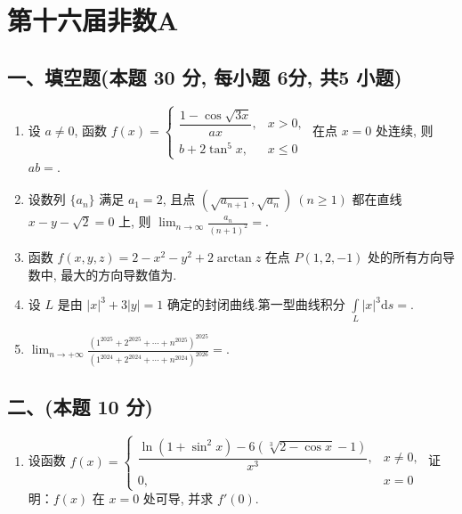 \newpage
\section{第十六届非数A}

\subsection*{一、填空题(本题 30 分,  每小题 6分,  共5 小题)}
\begin{enumerate}
    \item 设 $a \neq 0$, 函数
          $f(x) = \begin{cases}
                  \dfrac{1 - \cos \sqrt{3x}}{a x}, & x > 0,   \\[8pt]
                  b + 2 \tan^5 x,                  & x \leq 0
              \end{cases}$
          在点 $x = 0$ 处连续, 则 $ab =$\underline{\quad \quad}.
    \item 设数列 $\{a_n\}$ 满足 $a_1 = 2$, 且点 $(\sqrt{a_{n+1}}, \sqrt{a_n}) \ (n \geqslant 1)$ 都在直线 $x - y - \sqrt{2} = 0$ 上, 则 $\displaystyle\lim_{n \to \infty} \frac{a_n}{(n + 1)^2} =$\underline{\quad \quad}.
    \item 函数 $f(x, y, z) = 2 - x^2 - y^2 + 2 \arctan z$ 在点 $P(1, 2, -1)$ 处的所有方向导数中, 最大的方向导数值为\underline{\quad \quad}.
    \item 设 $L$ 是由 $|x|^3 + 3|y| = 1$ 确定的封闭曲线.第一型曲线积分 $\displaystyle\int\limits_L |x|^3 \mathrm{d}s =$\underline{\quad \quad}.
    \item $\displaystyle\lim_{n \to + \infty} \frac{(1^{2025} + 2^{2025} + \cdots + n^{2025})^{2025}}{(1^{2024} + 2^{2024} + \cdots + n^{2024})^{2026}} =$\underline{\quad \quad}.
\end{enumerate}

\subsection*{二、(本题 10 分)}
\begin{enumerate}[start=6]
    \item 设函数
          $f(x) = \begin{cases}
                  \dfrac{\ln(1 + \sin^2 x) - 6\left(\sqrt[3]{2- \cos x}  - 1\right)}{x^3}, & x \neq 0, \\[10pt]
                  0,                                                                       & x = 0
              \end{cases}$
          证明：$f(x)$ 在 $x = 0$ 处可导, 并求 $f'(0)$.
\end{enumerate}

